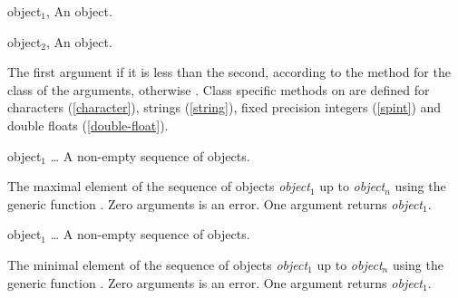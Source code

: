 \begin{optDefinition}
%
\begin{genericargs}
    \item[object$_1$, \classref{object}] An object.
    \item[object$_2$, \classref{object}] An object.
\end{genericargs}
%
\result%
The first argument if it is less than the second, according to the method for
the class of the arguments, otherwise \nil.
%
\seealso%
Class specific methods on  are defined for characters
(\ref{character}), strings (\ref{string}), fixed precision integers
(\ref{spint}) and double floats (\ref{double-float}).

%
\begin{arguments}
    \item[object$_1$ \ldots] A non-empty sequence of objects.
\end{arguments}
%
\result%
The maximal element of the sequence of objects {\em object$_1$} up to {\em
    object$_n$} using the generic function .  Zero arguments
is an error.  One argument returns {\em object$_1$}.

%
\begin{arguments}
    \item[object$_1$ \ldots] A non-empty sequence of objects.
\end{arguments}
%
\result%
The minimal element of the sequence of objects {\em object$_1$} up to {\em
    object$_n$} using the generic function .  Zero arguments
is an error.  One argument returns {\em object$_1$}.
%
\end{optDefinition}
